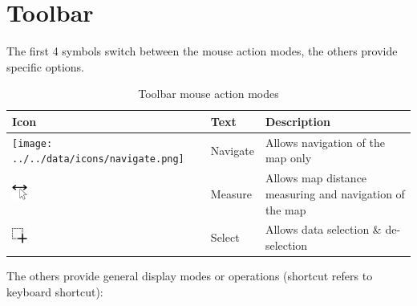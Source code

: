 \section{Toolbar}

The first 4 symbols switch between the mouse action modes, the others provide specific options.

\begin{table}[H]
  \center
  \begin{tabular}{ | l | l | l |}
    \hline
    \textbf{Icon} & \textbf{Text} &  \textbf{Description} \\ \hline
    \texttt{[image: ../../data/icons/navigate.png]} & Navigate & Allows navigation of the map only \\ \hline
    \includegraphics[width=0.5cm,frame]{../../data/icons/measure_action.png} & Measure & Allows map distance measuring and navigation of the map \\ \hline
    \includegraphics[width=0.5cm,frame]{../../data/icons/select_action.png} & Select & Allows data selection \& de-selection \\ \hline
  \end{tabular}
  \caption{Toolbar mouse action modes}
\end{table}

The others provide general display modes or operations (shortcut refers to keyboard shortcut):

